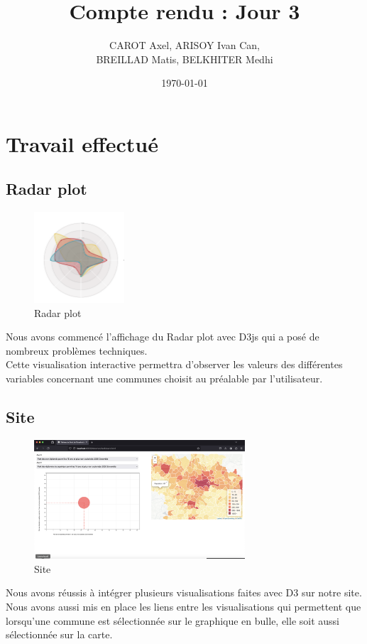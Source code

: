 \documentclass{article}
\title{Compte rendu : Jour 3}
\author{CAROT Axel, ARISOY Ivan Can, \\ BREILLAD Matis, BELKHITER Medhi}
\date{\today}
\begin{document}
\maketitle

\section{Travail effectué}

\subsection{Radar plot}

\begin{figure}[h]
    \centering
    \includegraphics[width=0.3\textwidth]{radar.png}
    \caption{Radar plot}
    \label{fig:Radar plot}
\end{figure}

Nous avons commencé l'affichage du Radar plot avec D3js qui a posé de nombreux problèmes techniques. \\

Cette visualisation interactive permettra d'observer les valeurs des différentes variables concernant une communes choisit au préalable par l'utilisateur.

\subsection{Site}

\begin{figure}[h]
    \centering
    \includegraphics[width=0.7\textwidth]{medhi_site.png}
    \caption{Site}
    \label{fig:Site}
\end{figure}
\vspace{5cm}
Nous avons réussis à intégrer plusieurs visualisations faites avec D3 sur notre site. Nous avons aussi mis en place les liens entre les visualisations qui permettent que lorsqu'une commune est sélectionnée sur le graphique en bulle, elle soit aussi sélectionnée sur la carte. \\
\end{document}
